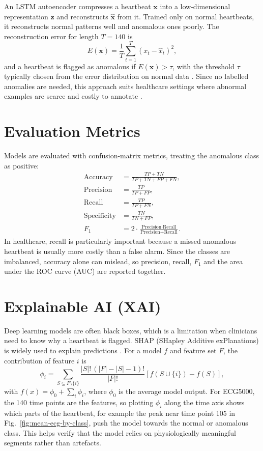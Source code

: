 \documentclass[conference]{IEEEtran}
\begin{document}
An LSTM autoencoder compresses a heartbeat $\mathbf{x}$ into a low-dimensional representation $\mathbf{z}$ and reconstructs $\hat{\mathbf{x}}$ from it. Trained only on normal heartbeats, it reconstructs normal patterns well and anomalous ones poorly. The reconstruction error for length $T=140$ is
\begin{equation}
    E(\mathbf{x}) = \frac{1}{T}\sum_{t=1}^{T}\left(x_t - \hat{x}_t\right)^2 ,
\end{equation}
and a heartbeat is flagged as anomalous if $E(\mathbf{x}) > \tau$, with the threshold $\tau$ typically chosen from the error distribution on normal data \citep{shi2026}. Since no labelled anomalies are needed, this approach suits healthcare settings where abnormal examples are scarce and costly to annotate \citep{shi2026,alamr2023}.

\section{Evaluation Metrics}

Models are evaluated with confusion-matrix metrics, treating the anomalous class as positive:
\begin{align}
    \text{Accuracy} &= \frac{TP + TN}{TP + TN + FP + FN}, \\
    \text{Precision} &= \frac{TP}{TP + FP}, \\
    \text{Recall} &= \frac{TP}{TP + FN}, \\
    \text{Specificity} &= \frac{TN}{TN + FP}, \\
    F_1 &= 2\cdot\frac{\text{Precision}\cdot\text{Recall}}{\text{Precision}+\text{Recall}} .
\end{align}
In healthcare, recall is particularly important because a missed anomalous heartbeat is usually more costly than a false alarm. Since the classes are imbalanced, accuracy alone can mislead, so precision, recall, $F_1$ and the area under the ROC curve (AUC) are reported together.

\section{Explainable AI (XAI)}

Deep learning models are often black boxes, which is a limitation when clinicians need to know why a heartbeat is flagged. SHAP (SHapley Additive exPlanations) is widely used to explain predictions \citep{nayana2026}. For a model $f$ and feature set $F$, the contribution of feature $i$ is
\begin{equation}
    \phi_i = \sum_{S \subseteq F\setminus\{i\}} \frac{|S|!\,(|F|-|S|-1)!}{|F|!}\left[f(S\cup\{i\}) - f(S)\right],
\end{equation}
with $f(x) = \phi_0 + \sum_{i}\phi_i$, where $\phi_0$ is the average model output. For ECG5000, the 140 time points are the features, so plotting $\phi_i$ along the time axis shows which parts of the heartbeat, for example the peak near time point 105 in Fig.~\ref{fig:mean-ecg-by-class}, push the model towards the normal or anomalous class. This helps verify that the model relies on physiologically meaningful segments rather than artefacts.
\end{document}

